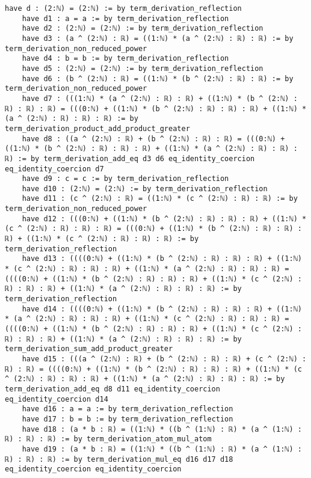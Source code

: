 \documentclass{article}
\begin{document}
\begin{tcolorbox}[colback=white!10, width=\linewidth]
\begin{lstlisting}[language=Lean4]
    have d : (2:ℕ) = (2:ℕ) := by term_derivation_reflection
    have d1 : a = a := by term_derivation_reflection
    have d2 : (2:ℕ) = (2:ℕ) := by term_derivation_reflection
    have d3 : (a ^ (2:ℕ) : ℝ) = ((1:ℕ) * (a ^ (2:ℕ) : ℝ) : ℝ) := by term_derivation_non_reduced_power
    have d4 : b = b := by term_derivation_reflection
    have d5 : (2:ℕ) = (2:ℕ) := by term_derivation_reflection
    have d6 : (b ^ (2:ℕ) : ℝ) = ((1:ℕ) * (b ^ (2:ℕ) : ℝ) : ℝ) := by term_derivation_non_reduced_power
    have d7 : (((1:ℕ) * (a ^ (2:ℕ) : ℝ) : ℝ) + ((1:ℕ) * (b ^ (2:ℕ) : ℝ) : ℝ) : ℝ) = (((0:ℕ) + ((1:ℕ) * (b ^ (2:ℕ) : ℝ) : ℝ) : ℝ) + ((1:ℕ) * (a ^ (2:ℕ) : ℝ) : ℝ) : ℝ) := by term_derivation_product_add_product_greater
    have d8 : ((a ^ (2:ℕ) : ℝ) + (b ^ (2:ℕ) : ℝ) : ℝ) = (((0:ℕ) + ((1:ℕ) * (b ^ (2:ℕ) : ℝ) : ℝ) : ℝ) + ((1:ℕ) * (a ^ (2:ℕ) : ℝ) : ℝ) : ℝ) := by term_derivation_add_eq d3 d6 eq_identity_coercion eq_identity_coercion d7
    have d9 : c = c := by term_derivation_reflection
    have d10 : (2:ℕ) = (2:ℕ) := by term_derivation_reflection
    have d11 : (c ^ (2:ℕ) : ℝ) = ((1:ℕ) * (c ^ (2:ℕ) : ℝ) : ℝ) := by term_derivation_non_reduced_power
    have d12 : (((0:ℕ) + ((1:ℕ) * (b ^ (2:ℕ) : ℝ) : ℝ) : ℝ) + ((1:ℕ) * (c ^ (2:ℕ) : ℝ) : ℝ) : ℝ) = (((0:ℕ) + ((1:ℕ) * (b ^ (2:ℕ) : ℝ) : ℝ) : ℝ) + ((1:ℕ) * (c ^ (2:ℕ) : ℝ) : ℝ) : ℝ) := by term_derivation_reflection
    have d13 : ((((0:ℕ) + ((1:ℕ) * (b ^ (2:ℕ) : ℝ) : ℝ) : ℝ) + ((1:ℕ) * (c ^ (2:ℕ) : ℝ) : ℝ) : ℝ) + ((1:ℕ) * (a ^ (2:ℕ) : ℝ) : ℝ) : ℝ) = ((((0:ℕ) + ((1:ℕ) * (b ^ (2:ℕ) : ℝ) : ℝ) : ℝ) + ((1:ℕ) * (c ^ (2:ℕ) : ℝ) : ℝ) : ℝ) + ((1:ℕ) * (a ^ (2:ℕ) : ℝ) : ℝ) : ℝ) := by term_derivation_reflection
    have d14 : ((((0:ℕ) + ((1:ℕ) * (b ^ (2:ℕ) : ℝ) : ℝ) : ℝ) + ((1:ℕ) * (a ^ (2:ℕ) : ℝ) : ℝ) : ℝ) + ((1:ℕ) * (c ^ (2:ℕ) : ℝ) : ℝ) : ℝ) = ((((0:ℕ) + ((1:ℕ) * (b ^ (2:ℕ) : ℝ) : ℝ) : ℝ) + ((1:ℕ) * (c ^ (2:ℕ) : ℝ) : ℝ) : ℝ) + ((1:ℕ) * (a ^ (2:ℕ) : ℝ) : ℝ) : ℝ) := by term_derivation_sum_add_product_greater
    have d15 : (((a ^ (2:ℕ) : ℝ) + (b ^ (2:ℕ) : ℝ) : ℝ) + (c ^ (2:ℕ) : ℝ) : ℝ) = ((((0:ℕ) + ((1:ℕ) * (b ^ (2:ℕ) : ℝ) : ℝ) : ℝ) + ((1:ℕ) * (c ^ (2:ℕ) : ℝ) : ℝ) : ℝ) + ((1:ℕ) * (a ^ (2:ℕ) : ℝ) : ℝ) : ℝ) := by term_derivation_add_eq d8 d11 eq_identity_coercion eq_identity_coercion d14
    have d16 : a = a := by term_derivation_reflection
    have d17 : b = b := by term_derivation_reflection
    have d18 : (a * b : ℝ) = ((1:ℕ) * ((b ^ (1:ℕ) : ℝ) * (a ^ (1:ℕ) : ℝ) : ℝ) : ℝ) := by term_derivation_atom_mul_atom
    have d19 : (a * b : ℝ) = ((1:ℕ) * ((b ^ (1:ℕ) : ℝ) * (a ^ (1:ℕ) : ℝ) : ℝ) : ℝ) := by term_derivation_mul_eq d16 d17 d18 eq_identity_coercion eq_identity_coercion

\end{lstlisting}
\end{tcolorbox}
\end{document}
